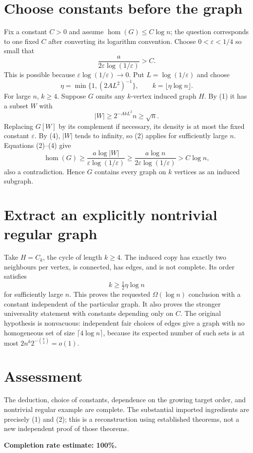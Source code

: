 \documentclass[11pt]{article}
\begin{document}
\section*{Choose constants before the graph}
Fix a constant $C>0$ and assume $\operatorname{hom}(G)\le C\log n$; the question corresponds to one fixed $C$ after converting its logarithm convention. Choose $0<\varepsilon<1/4$ so small that
\[
 \frac{a}{2\varepsilon\log(1/\varepsilon)}>C.
\tag{3}
\]
This is possible because $\varepsilon\log(1/\varepsilon)\to0$. Put $L=\log(1/\varepsilon)$ and choose
\[
 \eta=\min\{1,(2AL^2)^{-1}\},\qquad
 k=\lfloor\eta\log n\rfloor.
\]
For large $n$, $k\ge4$. Suppose $G$ omits any $k$-vertex induced graph $H$. By (1) it has a subset $W$ with
\[
 |W|\ge2^{-AkL^2}n\ge\sqrt n.
\tag{4}
\]
Replacing $G[W]$ by its complement if necessary, its density is at most the fixed constant $\varepsilon$. By (4), $|W|$ tends to infinity, so (2) applies for sufficiently large $n$. Equations (2)--(4) give
\[
 \operatorname{hom}(G)\ge
 \frac{a\log |W|}{\varepsilon\log(1/\varepsilon)}
 \ge\frac{a\log n}{2\varepsilon\log(1/\varepsilon)}
 > C\log n,
\]
also a contradiction. Hence $G$ contains every graph on $k$ vertices as an induced subgraph.

\section*{Extract an explicitly nontrivial regular graph}
Take $H=C_k$, the cycle of length $k\ge4$. The induced copy has exactly two neighbours per vertex, is connected, has edges, and is not complete. Its order satisfies
\[
 k\ge\tfrac12\eta\log n
\]
for sufficiently large $n$. This proves the requested $\Omega(\log n)$ conclusion with a constant independent of the particular graph. It also proves the stronger universality statement with constants depending only on $C$. The original hypothesis is nonvacuous: independent fair choices of edges give a graph with no homogeneous set of size $\lceil4\log n\rceil$, because its expected number of such sets is at most $2n^k2^{-\binom k2}=o(1)$.

\section*{Assessment}
The deduction, choice of constants, dependence on the growing target order, and nontrivial regular example are complete. The substantial imported ingredients are precisely (1) and (2); this is a reconstruction using established theorems, not a new independent proof of those theorems.

\textbf{Completion rate estimate: 100\%.}
\end{document}
